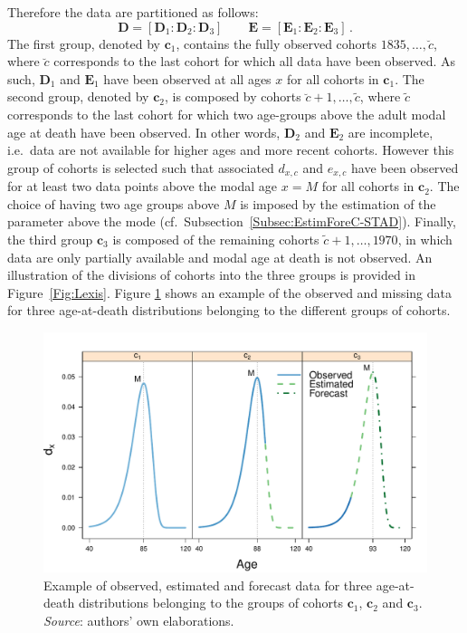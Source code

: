 \documentclass[11pt, a4paper]{article}
\begin{document}
Therefore the data are partitioned as follows:
\begin{equation}\label{eq:DataDiv}
\bm{D} = \left[ \bm{D}_{1} : \bm{D}_{2} : \bm{D}_{3}\right] \qquad \bm{E} = \left[ \bm{E}_{1} : \bm{E}_{2} : \bm{E}_{3}\right] \, .
\end{equation}
The first group, denoted by $\bm{c}_1$, contains the fully observed cohorts $1835,\ldots,\breve{c}$, where $\breve{c}$ corresponds to the last cohort for which all data have been observed. As such, $\bm{D}_{1}$ and $\bm{E}_{1}$ have been observed at all ages $x$ for all cohorts in $\bm{c}_1$. The second group, denoted by $\bm{c}_2$, is composed by cohorts $\breve{c}+1, \ldots, \tilde{c}$, where $\tilde{c}$ corresponds to the last cohort for which two age-groups above the adult modal age at death have been observed. In other words, $\bm{D}_{2}$ and $\bm{E}_{2}$ are incomplete, i.e.~data are not available for higher ages and more recent cohorts. However this group of cohorts is selected such that associated $d_{x,c}$ and $e_{x,c}$ have been observed for at least two data points above the modal age $x=M$ for all cohorts in $\bm{c}_2$. The choice of having two age groups above $M$ is imposed by the estimation of the parameter above the mode (cf.~Subsection~\ref{Subsec:EstimForeC-STAD}). Finally, the third group $\bm{c}_3$ is composed of the remaining cohorts $\tilde{c}+1, \ldots, 1970$, in which data are only partially available and modal age at death is not observed. An illustration of the divisions of cohorts into the three groups is provided in Figure~\ref{Fig:Lexis}. Figure \ref{Fig:DxExample} shows an example of the observed and missing data for three age-at-death distributions belonging to the different groups of cohorts. 

\begin{figure}[t]
	\begin{center}
		\includegraphics[scale=0.7]{./Figures/F4.pdf} 
		\caption{Example of observed, estimated and forecast data for three age-at-death distributions belonging to the groups of cohorts $\bm{c}_1$, $\bm{c}_2$ and $\bm{c}_3$.\\
		\small \textit{Source}: authors' own elaborations.\label{Fig:DxExample} }    
	\end{center}
\end{figure}
\end{document}
